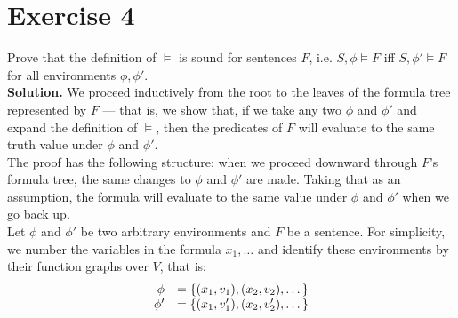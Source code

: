 \section{Exercise 4}

Prove that the definition of $\models$ is sound for sentences $F$, i.e. $S,\phi \models F$ iff $S,\phi' \models F$ for all environments $\phi, \phi'$.\\

\noindent
\textbf{Solution.}
We proceed inductively from the root to the leaves of the formula tree represented by $F$ --- that is, we show that, if we take any two $\phi$ and $\phi'$ and expand the definition of $\models$, then the predicates of $F$ will evaluate to the same truth value under $\phi$ and $\phi'$.\\

The proof has the following structure: when we proceed downward through $F$'s formula tree, the same changes to $\phi$ and $\phi'$ are made. Taking that as an assumption, the formula will evaluate to the same value under $\phi$ and $\phi'$ when we go back up.\\

\noindent
Let $\phi$ and $\phi'$ be two arbitrary environments and $F$ be a sentence. For simplicity, we number the variables in the formula $x_1,\dots$ and identify these environments by their function graphs over $V$, that is:
$$
	\begin{array}{r l }
		\phi  & = \{ (x_1,v_1), (x_2, v_2), \dots \}\\
		\phi' & = \{ (x_1,v_1'), (x_2, v_2'), \dots \}
	\end{array}
$$

